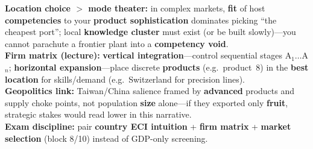\documentclass[10pt,a4paper]{article}
\begin{document}
{\textbf{Location choice $>$ mode theater:} in complex markets, \textbf{fit} of host \textbf{competencies} to your \textbf{product sophistication} dominates picking ``the cheapest port''; local \textbf{knowledge cluster} must exist (or be built slowly)---you cannot parachute a frontier plant into a \textbf{competency void}.\\
\textbf{Firm matrix (lecture):} \textbf{vertical integration}---control sequential stages A$_1\ldots$A$_n$; \textbf{horizontal expansion}---place discrete \textbf{products} (e.g.\ product~8) in the \textbf{best location} for skills/demand (e.g.\ Switzerland for precision lines).\\
\textbf{Geopolitics link:} Taiwan/China salience framed by \textbf{advanced} products and supply choke points, not population \textbf{size} alone---if they exported only \textbf{fruit}, strategic stakes would read lower in this narrative.\\
\textbf{Exam discipline:} pair \textbf{country ECI intuition} + \textbf{firm matrix} + \textbf{market selection} (block 8/10) instead of GDP-only screening.
}
\end{document}
